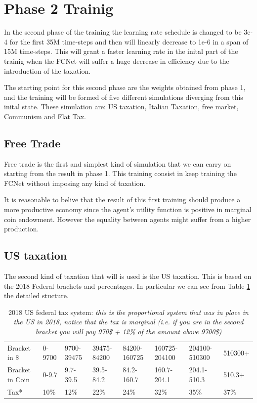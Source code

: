 \section{Phase 2 Trainig}

    
In the second phase of the training the learning rate schedule is changed to be 3e-4 for the first 35M time-steps and then will linearly decrease to 1e-6 in a span of 15M time-steps. This will grant a faster learning rate in the inital part of the trainig when the FCNet will suffer a huge decrease in efficiency due to the introduction of the taxation. 

The starting point for this second phase are the weights obtained from phase 1, and the training will be formed of five different simulations diverging from this inital state. These simulation are: US taxation, Italian Taxation, free market, Communism and Flat Tax.

\subsection{Free Trade}

Free trade is the first and simplest kind of simulation that we can carry on starting from the result in phase 1. This training consist in keep training the FCNet without imposing any kind of taxation. 

It is reasonable to belive that the result of this first training should produce a more productive economy since the agent's utility function is positive in marginal coin endowment. However the equality between agents might suffer from a higher production.

\subsection{US taxation}

The second kind of taxation that will is used is the US taxation. This is based on the 2018 Federal brachets and percentages. In particular we can see from Table \ref{tab:us_tax} the detailed stucture. 

\begin{table}[h!]
\begin{adjustbox}{max width=\textwidth}
    \begin{tabular}{llllllll}
        \hline
    Bracket in \$   & 0-9700 & 9700-39475 & 39475-84200 & 84200-160725 & 160725-204100 & 204100-510300 & 510300+ \\
    Bracket in Coin & 0-9.7  & 9.7-39.5   & 39.5-84.2   & 84.2-160.7   & 160.7-204.1   & 204.1-510.3   & 510.3+  \\
    Tax*            & 10\%   & 12\%       & 22\%        & 24\%         & 32\%          & 35\%          & 37\%\\
    \hline
    \end{tabular}
\end{adjustbox}
    \caption[2018 US federal tax system:]%
    {\label{tab:us_tax}2018 US federal tax system: \small \textit{this is the proportional system that was in place in the US in 2018, notice that the tax is marginal (i.e. if you are in the second bracket you will pay 970\$ + 12\% of the amount above 9700\$) }}
\end{table}

